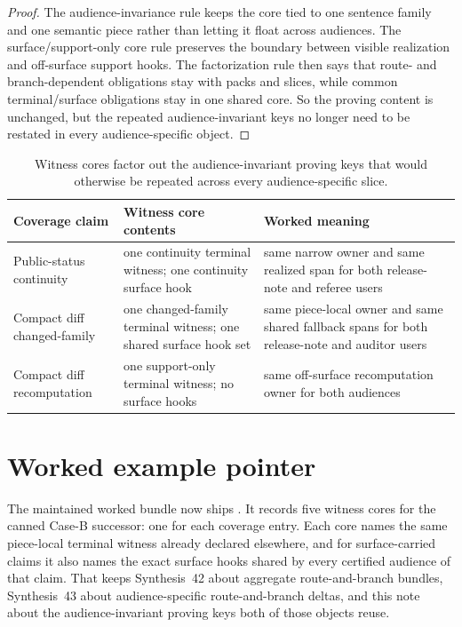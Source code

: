 \documentclass[11pt]{article}
\begin{document}
\begin{proof}
The audience-invariance rule keeps the core tied to one sentence family and one semantic piece rather than letting it float across audiences.
The surface/support-only core rule preserves the boundary between visible realization and off-surface support hooks.
The factorization rule then says that route- and branch-dependent obligations stay with packs and slices, while common terminal/surface obligations stay in one shared core.
So the proving content is unchanged, but the repeated audience-invariant keys no longer need to be restated in every audience-specific object.\qedhere
\end{proof}

\begin{table}[t]
\centering
\small
\begin{tabularx}{\linewidth}{@{}l l X@{}}
\toprule
Coverage claim & Witness core contents & Worked meaning \\
\midrule
Public-status continuity & one continuity terminal witness; one continuity surface hook & same narrow owner and same realized span for both release-note and referee users \\
Compact diff changed-family & one changed-family terminal witness; one shared surface hook set & same piece-local owner and same shared fallback spans for both release-note and auditor users \\
Compact diff recomputation & one support-only terminal witness; no surface hooks & same off-surface recomputation owner for both audiences \\
\bottomrule
\end{tabularx}
\caption{Witness cores factor out the audience-invariant proving keys that would otherwise be repeated across every audience-specific slice.}
\label{tab:witnesscores}
\end{table}

\section{Worked example pointer}
The maintained worked bundle now ships .\cite{series:workedexample}
It records five witness cores for the canned Case-B successor: one for each coverage entry.
Each core names the same piece-local terminal witness already declared elsewhere, and for surface-carried claims it also names the exact surface hooks shared by every certified audience of that claim.
That keeps Synthesis~42 about aggregate route-and-branch bundles, Synthesis~43 about audience-specific route-and-branch deltas, and this note about the audience-invariant proving keys both of those objects reuse.\cite{series:challengecoveragewitnesspacks,series:challengecoveragewitnessslices}
\end{document}
